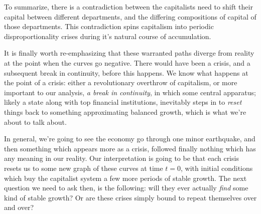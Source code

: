 \documentclass{article}
\theoremstyle{theorem}
\begin{document}
To summarize, there is a contradiction between the capitalists need to shift their capital between different departments, and the differing compositions of capital of those departments. This contradiction spins capitalism into periodic disproportionality crises during it's natural course of accumulation. \par 
It is finally worth re-emphasizing that these warranted paths diverge from reality at the point when the curves go negative. There would have been a crisis, and a subsequent break in continuity, before this happens. We know what happens at the point of a crisis: either a revolutionary overthrow of capitalism, or more important to our analysis, \emph{a break in continuity}, in which some central apparatus; likely a state along with top financial institutions, inevitably steps in to \emph{reset} things back to something approximating balanced growth, which is what we're about to talk about.  \par  
  In general, we're going to see the economy go through one minor earthquake, and then something which appears more as a crisis, followed finally nothing which has any meaning in our reality. Our interpretation is going to be that each crisis resets us to some new graph of these curves at time $t=0$, with initial conditions which buy the capitalist system a few more periods of stable growth. The next question we need to ask then, is the following: will they ever actually \emph{find} some kind of stable growth? Or are these crises simply bound to repeat themselves over and over?
\end{document}
